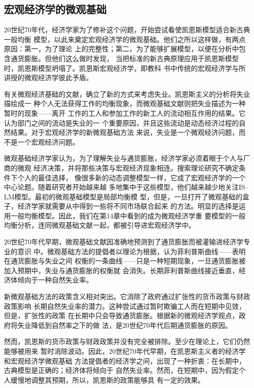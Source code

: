 \subsection{宏观经济学的微观基础}

20世纪70年代，经济学家为了修补这个问题，开始尝试看使凯恩斯模型适合新古典一般均衡
模型，以此来奠定宏观经济学的微观基础。他们之所以这样做，有两点原因：第一，为了理论
上的完整性；第二，为了能够扩展模型，以便在分析中包含通货膨胀。但他们这么做时发现，
当把标准的新古典原理应用于凯恩斯模型时，凯恩斯模型坍塌了。凯恩斯宏观经济学，即教科
书中传统的宏观经济学与所讲授的微观经济学彼此予盾。

有关微观经济基础的文献，确立了新的方式来考虑失业。凯恩斯主义的分析将失业描绘成一
种个人无法获得工作的均衡现象，而微观基础文献则把失业描述为一种暂时的现象——离开
工作的工人和参加工作的新工人的流动相互作用的结果。它认为部门之间的流动是失业的一
个重要原因，并且这些流动是动态经济过程的自然结果。对于宏观经济学的新微观基础方法
来说，失业是一个微观经济问题，而不是一个宏观经济问题。

微观基础经济学家认为，为了理解失业与通货膨胀，经济学家必须着眼于个人与厂商的微观
经济决策，并将那些决策与宏观经济现象相连。搜索理论研究不确定条件下个人的最佳选择，
像很多新的动态调整模型一样，它成了宏观经济学的一个中心论题。随着研究者开始越来越
多地集中于这些模型，他们越来越少地关注IS--LM模型。最初的微观基础模型是局部均衡模
型，但是，一旦打开了微观基础的盒子，经济学家就需要从中得到一些将不同市场联合起来
的方法。明显的选择是运用一般均衡模型。因此，我们在第14章中看到的成为微观经济学重
要模型的一般均衡分析，连同微观基础文献一起，都被引导进宏观经济学中。

20世纪70年代早期，微观基础文献因准确地预测到了通货膨胀而被灌输进经济学专业的意识
中。微观基础方法的提倡者以理论为根据，认为菲利普斯曲线——表明在通货膨胀与失业之间
权衡的一条曲线——只是一种短期现象，一旦通货膨胀被加入预期中，失业与通货膨胀的权衡就
会消失。长期菲利普斯曲线接近垂直，经济体倾向于一种自然失业率。

新微观基础方法的政策含义相对突出。它消除了政府通过扩张性的货币政策与财政政策影响
长期自然失业率的潜力。这种尝试通过暂时欺骗工人而在短期中见效，但是，扩张性的政策
在长期中只会导致通货膨胀。根据新的微观经济学观点，政府将失业降低到自然率之下的做
法，是20世纪70年代后期通货膨胀的原因。

然而，凯恩斯的货币政策与财政政策并没有完全被排除。至少在理论上，它们仍然能够被用来
暂时消除波动。因此，20世纪70年代早期，在凯恩斯主义者的经济学和宏观经济学微观基础
方法提倡者的经济学之间，出现了一种折衷：在长期中，古典模型是正确的；经济体将倾向于
自然失业率。然而，在短期中，因为假定个人缓慢地调整其预期，所以，凯恩斯的政策能够具
有一定的效果。

